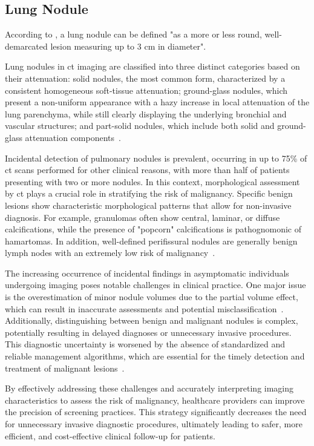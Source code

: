 \subsection{Lung Nodule}
According to \textcite{baum_incidental_2024, loverdos_lung_2019}, a lung nodule can be defined "as a more or less round, well-demarcated lesion measuring up to 3 cm in diameter".

Lung nodules in \ac{ct} imaging are classified into three distinct categories based on their attenuation: solid nodules, the most common form, characterized by a consistent homogeneous soft-tissue attenuation; ground-glass nodules, which present a non-uniform appearance with a hazy increase in local attenuation of the lung parenchyma, while still clearly displaying the underlying bronchial and vascular structures; and part-solid nodules, which include both solid and ground-glass attenuation components~\cite{loverdos_lung_2019}.

Incidental detection of pulmonary nodules is prevalent, occurring in up to 75\% of \ac{ct} scans performed for other clinical reasons, with more than half of patients presenting with two or more nodules. In this context, morphological assessment by \ac{ct} plays a crucial role in stratifying the risk of malignancy. Specific benign lesions show characteristic morphological patterns that allow for non-invasive diagnosis. For example, granulomas often show central, laminar, or diffuse calcifications, while the presence of "popcorn" calcifications is pathognomonic of hamartomas. In addition, well-defined perifissural nodules are generally benign lymph nodes with an extremely low risk of malignancy~\cite{baum_incidental_2024}.

The increasing occurrence of incidental findings in asymptomatic individuals undergoing imaging poses notable challenges in clinical practice. One major issue is the overestimation of minor nodule volumes due to the partial volume effect, which can result in inaccurate assessments and potential misclassification~\cite{larici_lung_2017}. Additionally, distinguishing between benign and malignant nodules is complex, potentially resulting in delayed diagnoses or unnecessary invasive procedures.
This diagnostic uncertainty is worsened by the absence of standardized and reliable management algorithms, which are essential for the timely detection and treatment of malignant lesions~\cite{loverdos_lung_2019}.

By effectively addressing these challenges and accurately interpreting imaging characteristics to assess the risk of malignancy, healthcare providers can improve the precision of screening practices. This strategy significantly decreases the need for unnecessary invasive diagnostic procedures, ultimately leading to safer, more efficient, and cost-effective clinical follow-up for patients.

